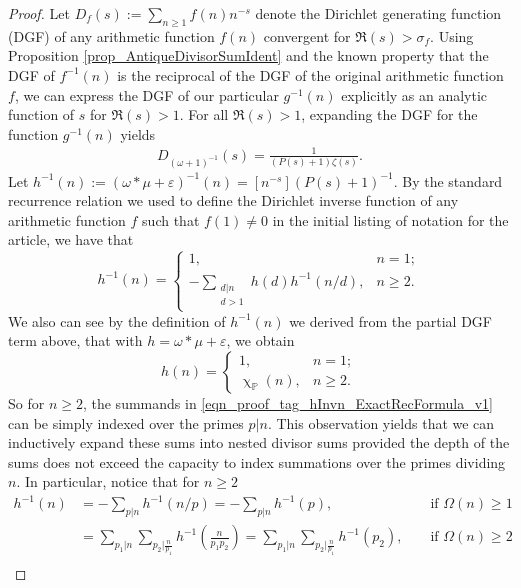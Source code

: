 \documentclass[11pt,reqno,a4letter]{article}
\numberwithin{figure}{section}
\numberwithin{table}{section}
\renewcommand{\chi}{\upchi}
\theoremstyle{plain}
\numberwithin{theorem}{section}
\theoremstyle{definition}
\begin{document}
\begin{proof} 
Let $D_f(s) := \sum_{n \geq 1} f(n) n^{-s}$ denote the Dirichlet generating function (DGF) of any 
arithmetic function $f(n)$ convergent for $\Re(s) > \sigma_f$. 
Using Proposition \ref{prop_AntiqueDivisorSumIdent} and the known property that the DGF of $f^{-1}(n)$ is 
the reciprocal of the DGF of the original arithmetic function $f$, we can express the DGF of our particular 
$g^{-1}(n)$ explicitly as an analytic function of $s$ for $\Re(s) > 1$. 
For all $\Re(s) > 1$, 
expanding the DGF for the function $g^{-1}(n)$ yields 
\begin{align} 
\label{eqn_DGF_of_gInvn} 
D_{(\omega+1)^{-1}}(s) = \frac{1}{(P(s)+1) \zeta(s)}. 
\end{align} 
Let $h^{-1}(n) := (\omega \ast \mu + \varepsilon)^{-1}(n) = [n^{-s}](P(s) + 1)^{-1}$. 
By the standard recurrence relation we used to define the Dirichlet inverse function of any 
arithmetic function $f$ such that $f(1) \neq 0$ in the initial listing of notation for the article, 
we have that 
\begin{equation} 
\label{eqn_proof_tag_hInvn_ExactRecFormula_v1}
h^{-1}(n) = \begin{cases} 
            1, & n = 1; \\ 
            -\sum\limits_{\substack{d|n \\ d>1}} h(d) h^{-1}(n/d), & n \geq 2. 
            \end{cases} 
\end{equation} 
We also can see by the definition of $h^{-1}(n)$ we derived from the partial DGF term above, that 
with $h = \omega \ast \mu + \varepsilon$, we obtain 
\[
h(n) = \begin{cases} 
       1, & n = 1; \\ 
       \chi_{\mathbb{P}}(n), & n \geq 2. 
       \end{cases} 
\]
So for $n \geq 2$, the summands in \eqref{eqn_proof_tag_hInvn_ExactRecFormula_v1} 
can be simply indexed over the primes $p|n$. This observation yields that we can inductively 
expand these sums into nested divisor sums provided the depth of the sums does not exceed the 
capacity to index summations over the primes dividing $n$. In particular, notice that for $n \geq 2$ 
\begin{align*} 
h^{-1}(n) & = -\sum_{p|n} h^{-1}(n/p) = -\sum_{p|n} h^{-1}(p), && \text{\ if\ } \Omega(n) \geq 1 \\ 
     & = \sum_{p_1|n} \sum_{p_2|\frac{n}{p_1}} h^{-1}\left(\frac{n}{p_1p_2}\right) = 
     \sum_{p_1|n} \sum_{p_2|\frac{n}{p_1}} h^{-1}(p_2), && \text{\ if\ } \Omega(n) \geq 2 \\ 

\end{align*}
\end{proof}
\end{document}
